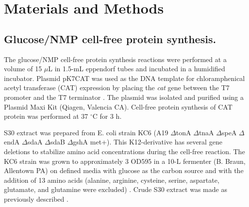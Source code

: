 \documentclass[journal=asbcd6,manuscript=article]{achemso}
\begin{document}
\clearpage

\section*{Materials and Methods}

\subsection*{Glucose/NMP cell-free protein synthesis.}
The glucose/NMP cell-free protein synthesis reactions were performed at a volume of 15 $\mu$L in 1.5-mL eppendorf tubes and incubated in a humidified incubator.
Plasmid pK7CAT was used as the DNA template for chloramphenical acetyl transferase (CAT) expression by placing the \emph{cat} gene between the T7 promoter and the T7 terminator \cite{Kigawa1995}.
The plasmid was isolated and purified using a Plasmid Maxi Kit (Qiagen, Valencia CA).
Cell-free protein synthesis of CAT protein was performed at 37 $^{\circ}$C for 3 h.

S30 extract was prepared from E. coli strain KC6 (A19 $\Delta$tonA $\Delta$tnaA $\Delta$speA $\Delta$endA $\Delta$sdaA $\Delta$sdaB $\Delta$gshA met+).
This K12-derivative has several gene deletions to stabilize amino acid concentrations during the cell-free reaction.
The KC6 strain was grown to approximately 3 OD595 in a 10-L fermenter (B. Braun, Allentown PA) on defined media with glucose as the carbon source and with the addition of 13 amino acids (alanine, arginine, cysteine, serine, aspartate, glutamate, and glutamine were excluded) \cite{Zawada:2003}.
Crude S30 extract was made as previously described \cite{Jewett:2002}.
\end{document}
